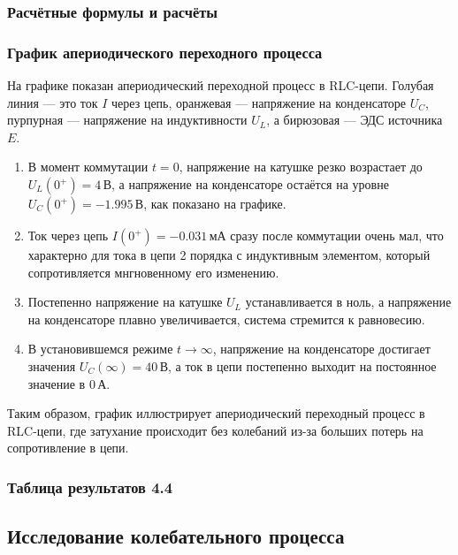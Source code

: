 \subsubsection{Расчётные формулы и расчёты}


\subsubsection{График апериодического переходного процесса}
На графике показан апериодический переходной процесс в RLC-цепи. Голубая линия — это ток \( I \) через цепь, оранжевая — напряжение на конденсаторе \( U_C \), пурпурная — напряжение на индуктивности \( U_L \), а бирюзовая — ЭДС источника \( E \).

\begin{enumerate}[noitemsep,topsep=0pt,left=6pt,label=\arabic*.]
	\item В момент коммутации \( t = 0 \), напряжение на катушке резко возрастает до \( U_L(0^+) = 4 \, \text{В} \), а напряжение на конденсаторе остаётся на уровне \( U_C(0^+) = -1.995 \, \text{В} \), как показано на графике.
	\item Ток через цепь \( I(0^+) = -0.031 \, \text{мА} \) сразу после коммутации очень мал, что характерно для тока в цепи 2 порядка с индуктивным элементом, который сопротивляется мнгновенному его изменению.
	\item Постепенно напряжение на катушке \( U_L \) устанавливается в ноль, а напряжение на конденсаторе плавно увеличивается, система стремится к равновесию.
	\item В установившемся режиме \( t \to \infty \), напряжение на конденсаторе достигает значения \( U_C(\infty) = 40 \, \text{В} \), а ток в цепи постепенно выходит на постоянное значение в \( 0 \, \text{А} \).
\end{enumerate}

Таким образом, график иллюстрирует апериодический переходный процесс в RLC-цепи, где затухание происходит без колебаний из-за больших потерь на сопротивление в цепи.


\subsubsection{Таблица результатов 4.4}





\subsection{Исследование колебательного процесса}

